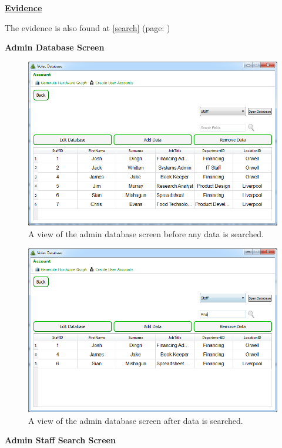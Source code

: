 \underline{\textbf{Evidence}}

The evidence is also found at \ref{search} (page: \pageref{search}) 

\textbf{Admin Database Screen}

\begin{figure}[H]
    \includegraphics[width=\textwidth]{./Evaluation/Images/beforeadminsearch.png}
    \caption{A view of the admin database screen before any data is searched.} 
\end{figure}


\begin{figure}[H]
    \includegraphics[width=\textwidth]{./Evaluation/Images/afteradminsearch.png}
    \caption{A view of the admin database screen after data is searched.} 
\end{figure}

\textbf{Admin Staff Search Screen}

